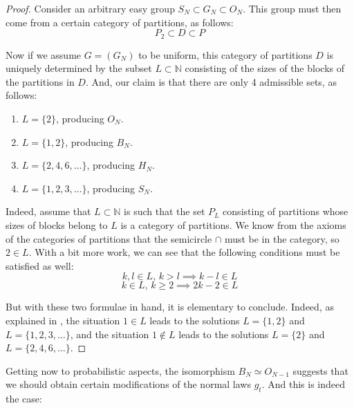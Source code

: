 \documentclass[12pt]{amsbook}
\begin{document}
\begin{proof}
Consider an arbitrary easy group $S_N\subset G_N\subset O_N$. This group must then come from a certain category of partitions, as follows:
$$P_2\subset D\subset P$$

Now if we assume $G=(G_N)$ to be uniform, this category of partitions $D$ is uniquely determined by the subset $L\subset\mathbb N$ consisting of the sizes of the blocks of the partitions in $D$. And, our claim is that there are only 4 admissible sets, as follows:

\smallskip

\begin{enumerate}
\item $L=\{2\}$, producing $O_N$.

\medskip

\item $L=\{1,2\}$, producing $B_N$.

\medskip

\item $L=\{2,4,6,\ldots\}$, producing $H_N$.

\medskip

\item $L=\{1,2,3,\ldots\}$, producing $S_N$.
\end{enumerate}

\smallskip

Indeed, assume that $L\subset\mathbb N$ is such that the set $P_L$ consisting of partitions whose sizes of blocks belong to $L$ is a category of partitions. We know from the axioms of the categories of partitions that the semicircle $\cap$ must be in the category, so $2\in L$. With a bit more work, we can see that the following conditions must be satisfied as well:
$$k,l\in L,\,k>l\implies k-l\in L$$
$$k\in L,\,k\geq 2\implies 2k-2\in L$$

But with these two formulae in hand, it is elementary to conclude. Indeed, as explained in \cite{bsp}, the situation $1\in L$ leads to the solutions $L=\{1,2\}$ and $L=\{1,2,3,\ldots\}$, and the situation $1\notin L$ leads to the solutions $L=\{2\}$ and $L=\{2,4,6,\ldots\}$.
\end{proof}

Getting now to probabilistic aspects, the isomorphism $B_N\simeq O_{N-1}$ suggests that we should obtain certain modifications of the normal laws $g_t$. And this is indeed the case:

\end{document}
